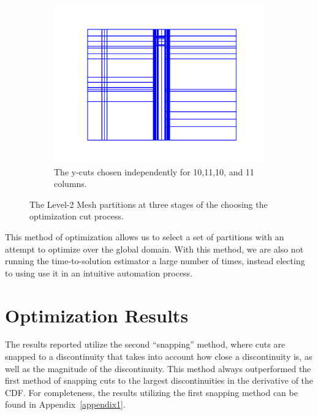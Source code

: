 \begin{figure}[h]
\begin{subfigure}[b]{\textwidth}
    \centering
\includegraphics[scale=0.5]{../../figures/lvl2_suite_2.pdf}
    \caption{The y-cuts chosen independently for 10,11,10, and 11 columns.}
    \label{10}
  \end{subfigure}
  \caption{The Level-2 Mesh partitions at three stages of the choosing the optimization cut process.}
  \label{opt_walkthrough}
\end{figure}

This method of optimization allows us to select a set of partitions with an attempt to optimize over the global domain.
With this method, we are also not running the time-to-solution estimator a large number of times, instead electing to using use it in an intuitive automation process.

\FloatBarrier

\section{Optimization Results}

The results reported utilize the second ``snapping'' method, where cuts are snapped to a discontinuity that takes into account how close a discontinuity is, as well as the magnitude of the discontinuity.
This method always outperformed the first method of snapping cuts to the largest discontinuities in the derivative of the CDF.
For completeness, the results utilizing the first snapping method can be found in Appendix~\ref{appendix1}.

